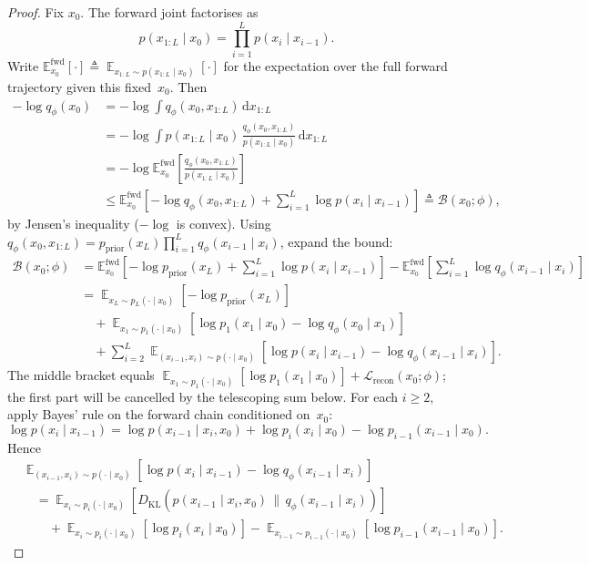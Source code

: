 \documentclass[11pt,a4paper]{article}
\renewcommand{\d}{\mathrm{d}}
\DeclareMathOperator*{\E}{\mathbb{E}}
\newcommand{\KL}[2]{D_{\mathrm{KL}}\!\left(#1\,\|\,#2\right)}
\newcommand{\pprior}{p_{\mathrm{prior}}}
\newcommand{\Lrecon}{\mathcal{L}_{\text{recon}}}
\newcommand{\Lbound}{\mathcal{B}}
\newcommand{\Efwd}{\mathbb{E}^{\mathrm{fwd}}_{x_0}}
\begin{document}
\begin{proof}
Fix $x_0$. The forward joint factorises as
\[
p(x_{1:L}\mid x_0)=\prod_{i=1}^{L}p(x_i\mid x_{i-1}).
\]
Write $\Efwd[\cdot]\triangleq\E_{x_{1:L}\sim p(x_{1:L}\mid x_0)}[\cdot]$
for the expectation over the full forward trajectory given this fixed~$x_0$.
Then
\begin{align*}
-\log q_\phi(x_0)
&= -\log \int q_\phi(x_0,x_{1:L})\,\d x_{1:L} \\
&= -\log \int p(x_{1:L}\mid x_0)\,
\frac{q_\phi(x_0,x_{1:L})}{p(x_{1:L}\mid x_0)}\,\d x_{1:L} \\
&= -\log \Efwd\!\left[\frac{q_\phi(x_0,x_{1:L})}{p(x_{1:L}\mid x_0)}\right] \\
&\le \Efwd\!\left[-\log q_\phi(x_0,x_{1:L})
+\sum_{i=1}^{L}\log p(x_i\mid x_{i-1})\right]
\triangleq \Lbound(x_0;\phi),
\end{align*}
by Jensen's inequality ($-\log$ is convex).
Using
$q_\phi(x_0,x_{1:L})=\pprior(x_L)\prod_{i=1}^{L}q_\phi(x_{i-1}\mid x_i)$,
expand the bound:
\begin{align*}
\Lbound(x_0;\phi)
&= \Efwd\!\left[-\log \pprior(x_L)+\sum_{i=1}^{L}\log p(x_i\mid x_{i-1})\right]
-\Efwd\!\left[\sum_{i=1}^{L}\log q_\phi(x_{i-1}\mid x_i)\right] \\
&= \E_{x_L\sim p_L(\cdot\mid x_0)}\!\left[-\log \pprior(x_L)\right] \\
&\quad
+\E_{x_1\sim p_1(\cdot\mid x_0)}
\!\left[\log p_1(x_1\mid x_0)-\log q_\phi(x_0\mid x_1)\right] \\
&\quad
+\sum_{i=2}^{L}
\E_{(x_{i-1},x_i)\sim p(\cdot\mid x_0)}
\!\left[\log p(x_i\mid x_{i-1})-\log q_\phi(x_{i-1}\mid x_i)\right].
\end{align*}
The middle bracket equals
$\E_{x_1\sim p_1(\cdot\mid x_0)}[\log p_1(x_1\mid x_0)]+\Lrecon(x_0;\phi)$;
the first part will be cancelled by the telescoping sum below.
For each $i\ge 2$, apply Bayes' rule on the forward chain conditioned on~$x_0$:
\[
\log p(x_i\mid x_{i-1})
=\log p(x_{i-1}\mid x_i,x_0)+\log p_i(x_i\mid x_0)-\log p_{i-1}(x_{i-1}\mid x_0).
\]
Hence
\begin{align*}
&\E_{(x_{i-1},x_i)\sim p(\cdot\mid x_0)}
\!\left[\log p(x_i\mid x_{i-1})-\log q_\phi(x_{i-1}\mid x_i)\right] \\
&\quad=
\E_{x_i\sim p_i(\cdot\mid x_0)}
\!\left[\KL{p(x_{i-1}\mid x_i,x_0)}{q_\phi(x_{i-1}\mid x_i)}\right] \\
&\quad\quad
+\E_{x_i\sim p_i(\cdot\mid x_0)}\!\left[\log p_i(x_i\mid x_0)\right]
-\E_{x_{i-1}\sim p_{i-1}(\cdot\mid x_0)}
\!\left[\log p_{i-1}(x_{i-1}\mid x_0)\right].

\end{align*}
\end{proof}
\end{document}
